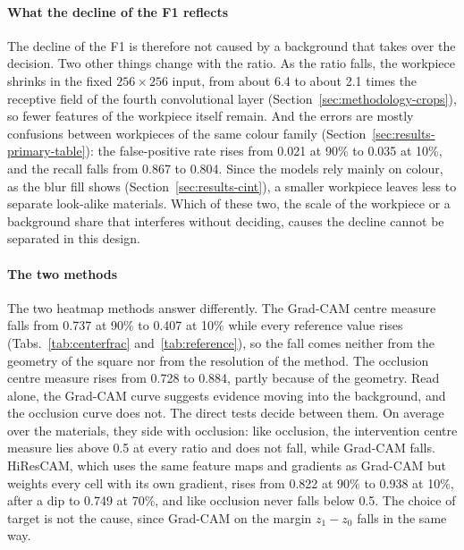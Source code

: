 \paragraph{What the decline of the F1 reflects}
The decline of the F1 is therefore not caused by a background that takes over the
decision. Two other things change with the ratio. As the ratio falls, the workpiece
shrinks in the fixed $256 \times 256$ input, from about 6.4 to about 2.1 times the
receptive field of the fourth convolutional layer (Section~\ref{sec:methodology-crops}), so fewer features of the workpiece
itself remain. And the errors are mostly confusions between workpieces of the same
colour family (Section~\ref{sec:results-primary-table}): the false-positive rate rises from 0.021 at
90\% to 0.035 at 10\%, and the recall falls from 0.867 to 0.804. Since the models rely
mainly on colour, as the blur fill shows (Section~\ref{sec:results-cint}), a smaller
workpiece leaves less to separate look-alike materials. Which of these two, the
scale of the workpiece or a background share that interferes without deciding, causes
the decline cannot be separated in this design.

\paragraph{The two methods}
The two heatmap methods answer differently. The Grad-CAM centre measure falls from 0.737
at 90\% to 0.407 at 10\% while every reference value rises
(Tabs.~\ref{tab:centerfrac} and~\ref{tab:reference}), so the fall comes neither from the
geometry of the square nor from the resolution of the method. The occlusion centre
measure rises from 0.728 to 0.884, partly because of the geometry. Read alone, the
Grad-CAM curve suggests evidence moving into the background, and the occlusion curve
does not. The direct tests decide between them. On average over the materials, they
side with occlusion: like occlusion, the intervention centre measure lies above 0.5 at every ratio and does not
fall, while Grad-CAM falls. HiResCAM, which uses the same feature maps and gradients as
Grad-CAM but weights every cell with its own gradient, rises from 0.822 at 90\% to 0.938
at 10\%, after a dip to 0.749 at 70\%, and like occlusion never falls below 0.5. The choice of target is not the cause, since Grad-CAM on the margin
$z_1 - z_0$ falls in the same way.

